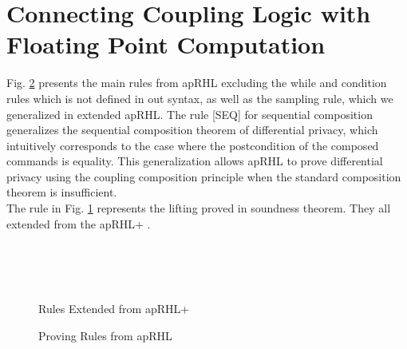 \documentclass[a4paper,11pt]{article}
\begin{document}
\section{
Connecting Coupling Logic
%
with Floating Point Computation
}
%
Fig. \ref{fig:aprhl} presents the main rules from apRHL excluding the while and condition rules which is not defined in out syntax, as well as the sampling rule, which we generalized in extended apRHL.
The rule [SEQ] for sequential composition generalizes the sequential composition theorem of differential privacy, which intuitively corresponds to the case where the postcondition of the composed commands is equality.
This generalization allows apRHL to prove differential privacy using the coupling composition principle when the standard composition theorem is insufficient.
\\
The rule in Fig. \ref{fig:aprhlplus} represents the lifting proved in soundness theorem. They all extended from the apRHL+ \cite{barthe2016proving}.
\begin{figure}[t]
\boxed{\vdash: \prog \times \prog \times \Phi \times \Phi}\\
\\
\\
\caption{Rules Extended from apRHL+}
\label{fig:aprhlplus}
\end{figure}

\begin{figure}[t]
\caption{Proving Rules from apRHL}
\label{fig:aprhl}
\end{figure}
\end{document}
